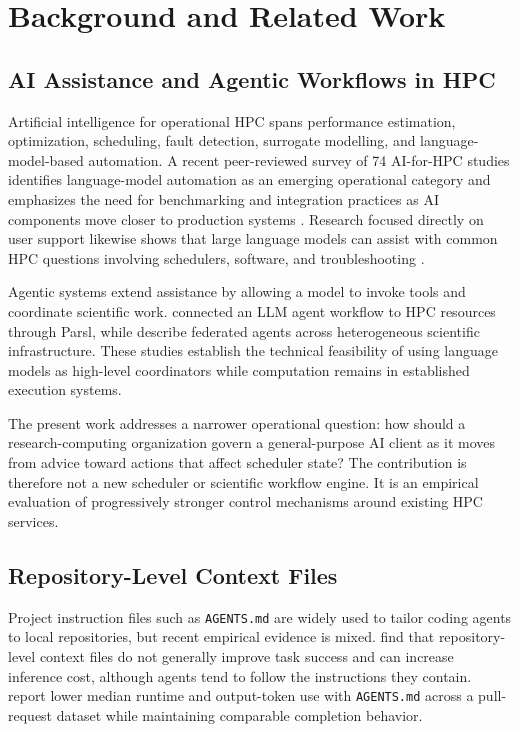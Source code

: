 \documentclass[11pt]{article}
\begin{document}
\section{Background and Related Work}

\subsection{AI Assistance and Agentic Workflows in HPC}

Artificial intelligence for operational HPC spans performance estimation, optimization, scheduling, fault detection, surrogate modelling, and language-model-based automation. A recent peer-reviewed survey of 74 AI-for-HPC studies identifies language-model automation as an emerging operational category and emphasizes the need for benchmarking and integration practices as AI components move closer to production systems \citep{pochelu2026aihpc}. Research focused directly on user support likewise shows that large language models can assist with common HPC questions involving schedulers, software, and troubleshooting \citep{zheng2026hpcsupport}.

Agentic systems extend assistance by allowing a model to invoke tools and coordinate scientific work. \citet{ma2025hpcagent} connected an LLM agent workflow to HPC resources through Parsl, while \citet{kamatar2026academy} describe federated agents across heterogeneous scientific infrastructure. These studies establish the technical feasibility of using language models as high-level coordinators while computation remains in established execution systems.

The present work addresses a narrower operational question: how should a research-computing organization govern a general-purpose AI client as it moves from advice toward actions that affect scheduler state? The contribution is therefore not a new scheduler or scientific workflow engine. It is an empirical evaluation of progressively stronger control mechanisms around existing HPC services.

\subsection{Repository-Level Context Files}

Project instruction files such as \texttt{AGENTS.md} are widely used to tailor coding agents to local repositories, but recent empirical evidence is mixed. \citet{gloaguen2026agents} find that repository-level context files do not generally improve task success and can increase inference cost, although agents tend to follow the instructions they contain. \citet{lulla2026agents} report lower median runtime and output-token use with \texttt{AGENTS.md} across a pull-request dataset while maintaining comparable completion behavior.
\end{document}
